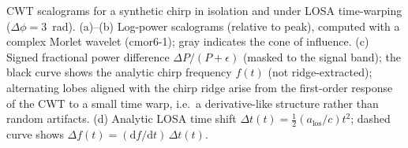 
\caption{CWT scalograms for a synthetic chirp in isolation and under LOSA time-warping ($\Delta\phi=3$~rad). (a)--(b) Log-power scalograms (relative to peak), computed with a complex Morlet wavelet (cmor6-1); gray indicates the cone of influence. (c) Signed fractional power difference $\Delta P/(P+\epsilon)$ (masked to the signal band); the black curve shows the analytic chirp frequency $f(t)$ (not ridge-extracted); alternating lobes aligned with the chirp ridge arise from the first-order response of the CWT to a small time warp, i.e.\ a derivative-like structure rather than random artifacts. (d) Analytic LOSA time shift $\Delta t(t)=\tfrac{1}{2}(a_{\mathrm{los}}/c)t^2$; dashed curve shows $\Delta f(t)=(\mathrm{d}f/\mathrm{d}t)\,\Delta t(t)$.}

